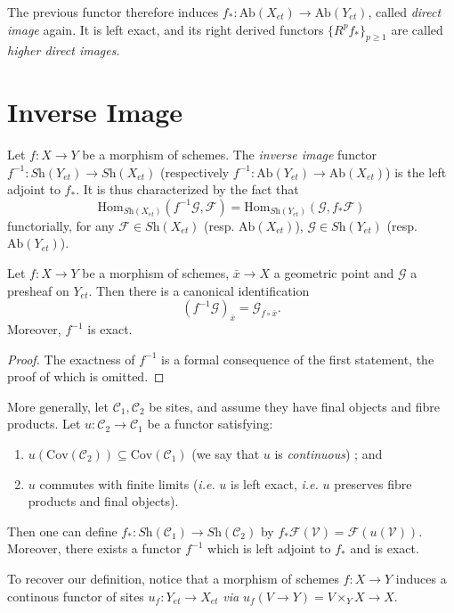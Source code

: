 \begin{definition}
The previous functor therefore induces $f_*:\text{Ab}(X_{et})\to 
\text{Ab}(Y_{et})$, called {\it direct image} again. It is left exact, and its 
right derived functors $\{R^pf_*\}_{p \geq 1}$ are called
{\it higher direct images}.  
\end{definition}
	
\section{Inverse Image}
\label{section-inverse-image}

\begin{definition}
Let $f: X\to Y$ be a morphism of schemes. The {\it inverse image} functor  
$f^{-1} : \textit{Sh}(Y_{et})\to \textit{Sh}(X_{et})$ (respectively $f^{-1}: 
\text{Ab}(Y_{et}) \to \text{Ab}(X_{et})$) is the left adjoint to $f_*$. It is 
thus characterized by the fact that 
$$
\text{Hom}_{{\textit{Sh}(X_{et})}} (f^{-1}\mathcal{G}, \mathcal{F}) = 
\text{Hom}_{\textit{Sh}(Y_{et})} (\mathcal{G}, f_*\mathcal{F}) 
$$
functorially, for any $\mathcal{F} \in \textit{Sh}(X_{et})$ (resp. 
$\text{Ab}(X_{et})$), $\mathcal{G} \in \textit{Sh}(Y_{et})$ (resp. 
$\text{Ab}(Y_{et})$).
\end{definition}

\begin{lemma} 
Let $f : X \to Y$ be a morphism of schemes, $\bar x \to X$ a geometric point 
and $\mathcal{G}$ a presheaf on $Y_{et}$. Then there is a canonical 
identification 
$$
\left(f^{-1}\mathcal{G}\right)_{\bar x} = \mathcal{G}_{f\circ \bar x}.
$$
Moreover, $f^{-1}$ is exact.
\end{lemma}

\begin{proof}
The exactness of $f^{-1}$ is a formal consequence of the first statement, the 
proof of which is omitted.
\end{proof}
	
\begin{remark}
More generally, let $\mathcal{C}_1, \mathcal{C}_2$ be sites, and assume they 
have final objects and fibre products.  Let  $u: \mathcal{C}_2 \to 
\mathcal{C}_1$ be a functor satisfying:
\begin{enumerate}
\item $u (\text{Cov}(\mathcal{C}_2)) \subseteq \text{Cov}(\mathcal{C}_1)$ (we 
say that $u$ is {\it continuous}) ; and
\item $u$ commutes with finite limits ({\it i.e.} $u$ is left exact, {\it i.e.} 
$u$ preserves fibre products and final objects).
\end{enumerate}
Then one can define $f_*: \textit{Sh}(\mathcal{C}_1) \to 
\textit{Sh}(\mathcal{C}_2)$ by $ f_* \mathcal{F}(\mathcal{V}) = 
\mathcal{F}(u(\mathcal{V}))$. Moreover, there exists a functor $f^{-1}$ which 
is left adjoint to $f_*$ and is exact.

\medskip\noindent
To recover our definition, notice that a morphism of schemes $ f: X  \to Y$ 
induces a continous functor of sites $u_f: Y_{et} \to X_{et}$ {\it via} $u_f (V 
\to Y) = V \times_Y X \to X$.
\end{remark}

